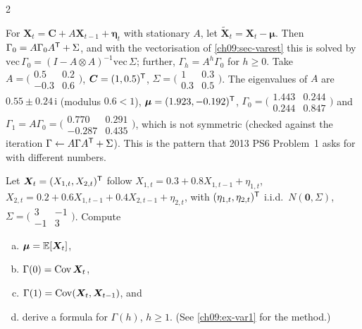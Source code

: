 \begin{paracol}{2}
\begin{example}\label{ch09:ex-var1}
For $\bm X_t=\bm C+A\bm X_{t-1}+\bm\eta_t$ with stationary $A$, let $\tilde{\bm X}_t=\bm X_t-\bm\mu$. Then
$\Gamma_0=A\Gamma_0A^{\mathsf T}+\Sigma$, and with the vectorisation of \cref{ch09:sec-varest} this is solved by
$\mathrm{vec}\,\Gamma_0=(I-A\otimes A)^{-1}\mathrm{vec}\,\Sigma$; further, $\Gamma_h=A^h\Gamma_0$ for $h\ge0$. Take
$A=\bigl(\begin{smallmatrix}0.5&0.2\\-0.3&0.6\end{smallmatrix}\bigr)$, $\bm C=(1,0.5)^{\mathsf T}$,
$\Sigma=\bigl(\begin{smallmatrix}1&0.3\\0.3&0.5\end{smallmatrix}\bigr)$. The eigenvalues of $A$ are $0.55\pm0.24\,\mathrm i$
(modulus $0.6<1$), $\bm\mu=(1.923,-0.192)^{\mathsf T}$,
$\Gamma_0=\bigl(\begin{smallmatrix}1.443&0.244\\0.244&0.847\end{smallmatrix}\bigr)$ and
$\Gamma_1=A\Gamma_0=\bigl(\begin{smallmatrix}0.770&0.291\\-0.287&0.435\end{smallmatrix}\bigr)$, which is not symmetric (checked against the
iteration $\Gamma\leftarrow A\Gamma A^{\mathsf T}+\Sigma$). This is the pattern that 2013 PS6 Problem~1 asks for with different numbers.
\end{example}

\begin{exercise}\label{ch09:ex-ps6-1}
Let $\bm X_t=(X_{1,t},X_{2,t})^{\mathsf T}$ follow $X_{1,t}=0.3+0.8X_{1,t-1}+\eta_{1,t}$, $X_{2,t}=0.2+0.6X_{1,t-1}+0.4X_{2,t-1}+\eta_{2,t}$, with $(\eta_{1,t},\eta_{2,t})^{\mathsf T}$ i.i.d.\ $N(\bm0,\Sigma)$, $\Sigma=\bigl(\begin{smallmatrix}3&-1\\-1&3\end{smallmatrix}\bigr)$.
Compute
\begin{enumerate}[(a)]
  \item $\bm\mu=\mathbb{E}[\bm X_t]$,
  \item $\Gamma(0)=\operatorname{Cov}\bm X_t$,
  \item $\Gamma(1)=\operatorname{Cov}(\bm X_t,\bm X_{t-1})$, and
  \item derive a formula for $\Gamma(h)$, $h\ge1$. (See \cref{ch09:ex-var1} for the method.)
\end{enumerate}
\end{exercise}


\end{paracol}
